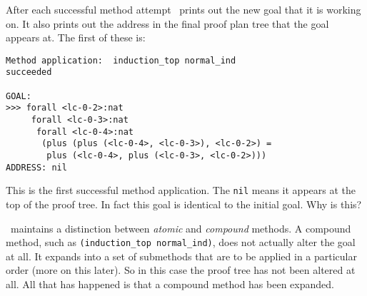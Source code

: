 After each successful method attempt \lclam\ prints out the new goal
that it is working on.  It also prints out the address in the final proof plan tree that the goal
appears at.  The first of these is:
\begin{verbatim}
Method application:  induction_top normal_ind
succeeded

GOAL:
>>> forall <lc-0-2>:nat
     forall <lc-0-3>:nat
      forall <lc-0-4>:nat
       (plus (plus (<lc-0-4>, <lc-0-3>), <lc-0-2>) =
        plus (<lc-0-4>, plus (<lc-0-3>, <lc-0-2>)))
ADDRESS: nil
\end{verbatim}
This is the first successful method application.  The {\tt nil} means it appears at the top of the
proof tree.  In fact this goal is identical to the
initial goal.  Why is this?

\lclam\ maintains a distinction between {\em atomic} and {\em
  compound} methods.  A
compound method, such as {\tt (induction\_top
  normal\_ind)}, does
not actually alter the goal at all.  It expands into a set of
submethods that are to be applied in a particular order (more on this
later).  So in this case the proof tree has not been
altered at all.  All that has happened is that a compound method has
been expanded.

